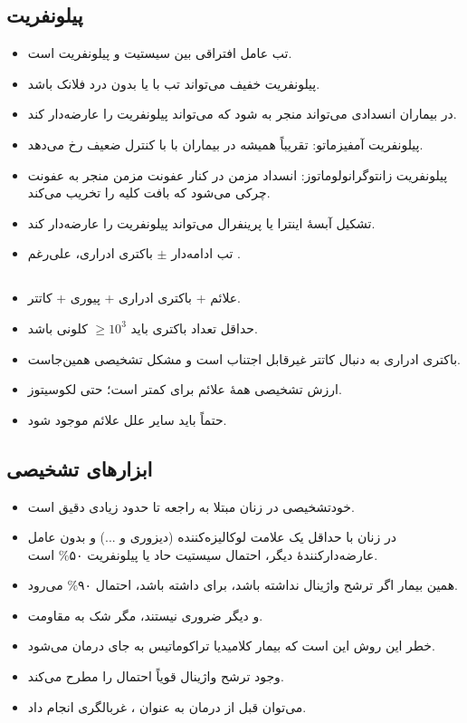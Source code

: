 \subsection*{پیلونفریت}
\begin{itemize}
\item تب عامل افتراقی بین سیستیت و پیلونفریت است.
\item پیلونفریت خفیف می‌تواند تب  با یا بدون درد فلانک باشد.
\item در بیماران انسدادی می‌تواند منجر به  شود که می‌تواند پیلونفریت را عارضه‌دار کند.
\item پیلونفریت آمفیزماتو: تقریباً همیشه در بیماران با  با کنترل ضعیف رخ می‌دهد.
\item پیلونفریت زانتوگرانولوماتوز: انسداد مزمن در کنار عفونت مزمن منجر به عفونت چرکی می‌شود که بافت کلیه را تخریب می‌کند.
\item تشکیل آبسهٔ اینترا یا پرینفرال می‌تواند پیلونفریت را عارضه‌دار کند.
\item تب ادامه‌دار $\pm$ باکتری ادراری، علی‌رغم .
\end{itemize}

\subsection*{}
\begin{itemize}
\item علائم + باکتری ادراری + پیوری + کاتتر.
\item حداقل تعداد باکتری باید $\geq 10^3$ کلونی باشد.
\item باکتری ادراری به دنبال کاتتر غیرقابل اجتناب است و مشکل تشخیصی همین‌جاست.
\item ارزش تشخیصی همهٔ علائم  برای  کمتر است؛ حتی لکوسیتوز.
\item حتماً باید سایر علل علائم موجود  شود.
\end{itemize}

\subsection*{ابزارهای تشخیصی}
\begin{itemize}
\item خودتشخیصی در زنان مبتلا به  راجعه تا حدود زیادی دقیق است.
\item در زنان با حداقل یک علامت لوکالیزه‌کننده (دیزوری و ...) و بدون عامل عارضه‌دارکنندهٔ دیگر، احتمال سیستیت حاد یا پیلونفریت ۵۰\% است.
\item همین بیمار اگر ترشح واژینال نداشته باشد،  برای  داشته باشد، احتمال ۹۰\% می‌رود.
\item {} و  دیگر ضروری نیستند، مگر شک به مقاومت.
\item خطر این روش این است که بیمار کلامیدیا تراکوماتیس به جای  درمان می‌شود.
\item وجود ترشح واژینال قویاً احتمال  را مطرح می‌کند.
\item می‌توان قبل از درمان به عنوان ، غربالگری  انجام داد.
\end{itemize}

